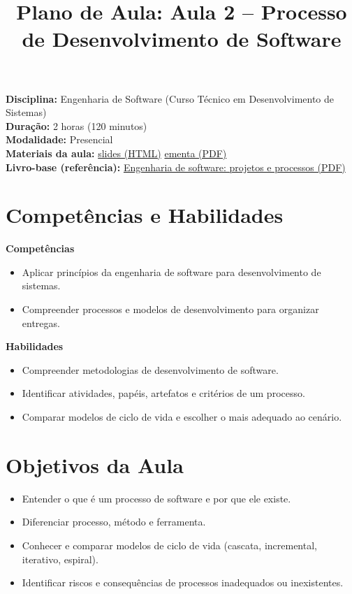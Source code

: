 \documentclass[12pt,a4paper]{article}
\title{Plano de Aula: Aula 2 -- Processo de Desenvolvimento de Software}
\date{}
\begin{document}
\maketitle

\noindent
\textbf{Disciplina:} Engenharia de Software (Curso Técnico em Desenvolvimento de Sistemas)\\
\textbf{Duração:} 2 horas (120 minutos)\\
\textbf{Modalidade:} Presencial\\
\textbf{Materiais da aula:} \href{aula-02.html}{slides (HTML)} \quad \href{aula-02.pdf}{ementa (PDF)}\\
\textbf{Livro-base (referência):} \href{../99-Materiais/Engenharia%20de%20software%20projetos%20e%20processos%20by%20Wilson%20de%20P%C3%A1dua%20Paula%20Filho%20.epub.pdf}{Engenharia de software: projetos e processos (PDF)}

\section{Competências e Habilidades}
\textbf{Competências}
\begin{itemize}[leftmargin=*,itemsep=0.25em]
  \item Aplicar princípios da engenharia de software para desenvolvimento de sistemas.
  \item Compreender processos e modelos de desenvolvimento para organizar entregas.
\end{itemize}

\textbf{Habilidades}
\begin{itemize}[leftmargin=*,itemsep=0.25em]
  \item Compreender metodologias de desenvolvimento de software.
  \item Identificar atividades, papéis, artefatos e critérios de um processo.
  \item Comparar modelos de ciclo de vida e escolher o mais adequado ao cenário.
\end{itemize}

\section{Objetivos da Aula}
\begin{itemize}[leftmargin=*,itemsep=0.25em]
  \item Entender o que é um processo de software e por que ele existe.
  \item Diferenciar processo, método e ferramenta.
  \item Conhecer e comparar modelos de ciclo de vida (cascata, incremental, iterativo, espiral).
  \item Identificar riscos e consequências de processos inadequados ou inexistentes.
\end{itemize}
\end{document}
